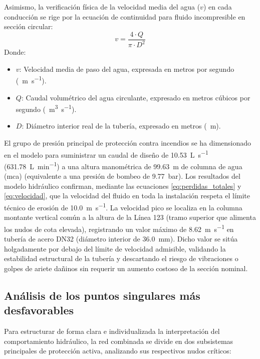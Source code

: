 \documentclass[12pt,a4paper]{article}
\begin{document}
Asimismo, la verificación física de la velocidad media del agua ($v$) en cada conducción se rige por la ecuación de continuidad para fluido incompresible en sección circular:
\begin{equation}
v = \frac{4 \cdot Q}{\pi \cdot D^2}
\label{eq:velocidad}
\end{equation}
Donde:
\begin{itemize}
	\item $v$: Velocidad media de paso del agua, expresada en metros por segundo (\SI{}{\meter\per\second}).
	\item $Q$: Caudal volumétrico del agua circulante, expresado en metros cúbicos por segundo (\SI{}{\meter\cubed\per\second}).
	\item $D$: Diámetro interior real de la tubería, expresado en metros (\SI{}{\meter}).
\end{itemize}

El grupo de presión principal de protección contra incendios se ha dimensionado en el modelo para suministrar un caudal de diseño de \SI{10.53}{\liter\per\second} (\SI{631.78}{\liter\per\minute}) a una altura manométrica de \SI{99.63}{\meter} de columna de agua (mca) (equivalente a una presión de bombeo de \SI{9.77}{\bar}). Los resultados del modelo hidráulico confirman, mediante las ecuaciones \ref{eq:perdidas_totales} y \ref{eq:velocidad}, que la velocidad del fluido en toda la instalación respeta el límite técnico de erosión de \SI{10.0}{\meter\per\second}. La velocidad pico se localiza en la columna montante vertical común a la altura de la Línea 123 (tramo superior que alimenta los nudos de cota elevada), registrando un valor máximo de \SI{8.62}{\meter\per\second} en tubería de acero DN32 (diámetro interior de \SI{36.0}{\milli\meter}). Dicho valor se sitúa holgadamente por debajo del límite de velocidad admisible, validando la estabilidad estructural de la tubería y descartando el riesgo de vibraciones o golpes de ariete dañinos sin requerir un aumento costoso de la sección nominal.

\subsection{Análisis de los puntos singulares más desfavorables}

Para estructurar de forma clara e individualizada la interpretación del comportamiento hidráulico, la red combinada se divide en dos subsistemas principales de protección activa, analizando sus respectivos nudos críticos:
\end{document}
